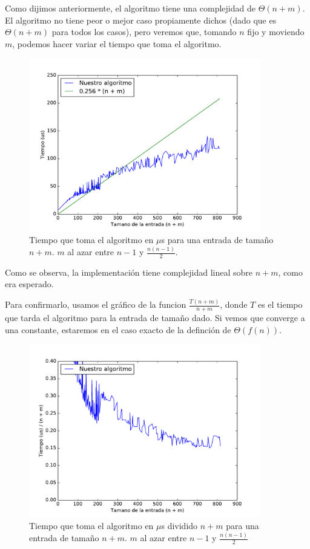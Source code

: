 
Como dijimos anteriormente, el algoritmo tiene una complejidad de $\Theta(n + m)$. El algoritmo no tiene peor o mejor caso propiamente dichos (dado que es $\Theta(n + m)$ para todos los casos), pero veremos que, tomando $n$ fijo y moviendo $m$, podemos hacer variar el tiempo que toma el algoritmo.



\begin{figure}[H]
 \centering
	\includegraphics[width=0.9\textwidth]{img/exp/problema1-promedio.pdf}
	\caption{\footnotesize Tiempo que toma el algoritmo en $\mu$s para una entrada de tamaño $n + m$. $m$ al azar entre $n-1$ y $\frac{n(n-1)}{2}$.}
	\label{fig:problema1-promedio}
\end{figure}

Como se observa, la implementación tiene complejidad lineal sobre $n + m$, como era esperado.

Para confirmarlo, usamos el gráfico de la funcion $\frac{T(n + m)}{n + m}$, donde $T$ es el tiempo que tarda el algoritmo para la entrada de tamaño dado.
Si vemos que converge a una constante, estaremos en el caso exacto de la definción de $\Theta(f(n))$.

\begin{figure}[H]
 \centering
	\includegraphics[width=0.9\textwidth]{img/exp/problema1-promedio2.pdf}
	\caption{\footnotesize Tiempo que toma el algoritmo en $\mu$s dividido $n + m$ para una entrada de tamaño $n + m$.  $m$ al azar entre $n-1$ y $\frac{n(n-1)}{2}$}
	\label{fig:problema1-promedio2}
\end{figure}

